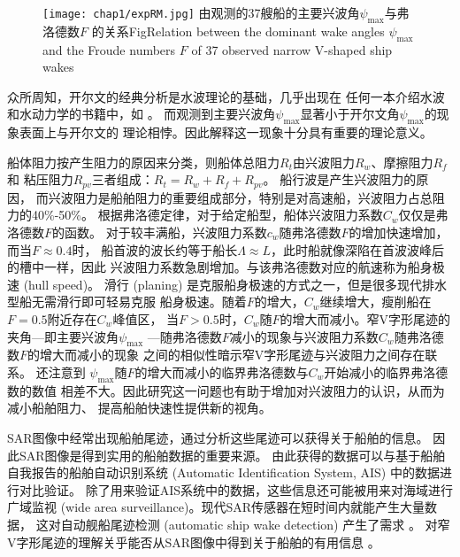 \begin{figure}[htp]
  \centering
  \captionstyle{\centering}
  \texttt{[image: chap1/expRM.jpg]}
  {由\parencite{Rabaud2013Ship}观测的37艘船的主要兴波角$\psi_{\max}$与弗洛德数$F$
的关系}{Fig}{Relation between the dominant wake angles $\psi_{\max}$ and the Froude 
numbers $F$ of 37 observed narrow V-shaped ship wakes}
\end{figure}

众所周知，开尔文的经典分析\supercite{Thomson1887ship}是水波理论的基础，几乎出现在
任何一本介绍水波和水动力学的书籍中，如
\parencite{newman1977marine,sheng2003principle}。
而观测到主要兴波角$\psi_{\max}$显著小于开尔文角$\psi_{\max}$的现象表面上与开尔文的
理论相悖。因此解释这一现象十分具有重要的理论意义。

船体阻力按产生阻力的原因来分类，则船体总阻力$R_t$由兴波阻力$R_w$、摩擦阻力$R_f$和
粘压阻力$R_{pv}$三者组成：$R_t=R_w+R_f+R_{pv}$。
船行波是产生兴波阻力的原因\supercite{Michell1898wave,Wehausen1973Wave}，
而兴波阻力是船舶阻力的重要组成部分，特别是对高速船，兴波阻力占总阻力的40\%-50\%。
根据弗洛德定律，对于给定船型，船体兴波阻力系数$C_w$仅仅是弗洛德数$F$的函数。
对于较丰满船，兴波阻力系数$c_w$随弗洛德数$F$的增加快速增加，而当$F\approx0.4$时，
船首波的波长约等于船长$\Lambda\approx L$，此时船就像深陷在首波波峰后的槽中一样，因此
兴波阻力系数急剧增加。与该弗洛德数对应的航速称为船身极速 (hull speed)。
滑行 (planing) 是克服船身极速的方式之一，但是很多现代排水型船无需滑行即可轻易克服
船身极速。随着$F$的增大，$C_w$继续增大，瘦削船在$F=0.5$附近存在$C_w$峰值区，
当$F>0.5$时，$C_w$随$F$的增大而减小。窄V字形尾迹的夹角---即主要兴波角$\psi_{\max}$
---随弗洛德数$F$减小的现象与兴波阻力系数$C_w$随弗洛德数$F$的增大而减小的现象
之间的相似性暗示窄V字形尾迹与兴波阻力之间存在联系\supercite{Rabaud2014narrow}。
\parencite{Rabaud2014narrow}还注意到
$\psi_{\max}$随$F$的增大而减小的临界弗洛德数与$C_w$开始减小的临界弗洛德数的数值
相差不大。因此研究这一问题也有助于增加对兴波阻力的认识，从而为减小船舶阻力、
提高船舶快速性提供新的视角。

SAR图像中经常出现船舶尾迹，通过分析这些尾迹可以获得关于船舶的信息。
因此SAR图像是得到实用的船舶数据的重要来源。
由此获得的数据可以与基于船舶自我报告的船舶自动识别系统
(Automatic Identification System, AIS) 中的数据进行对比验证。
除了用来验证AIS系统中的数据，这些信息还可能被用来对海域进行广域监视
(wide area surveillance)。现代SAR传感器在短时间内就能产生大量数据，
这对自动舰船尾迹检测 (automatic ship wake detection) 产生了需求
\supercite{Crisp2004state}。
对窄V字形尾迹的理解关乎能否从SAR图像中得到关于船舶的有用信息
\supercite{Tunaley2009narrow}。

